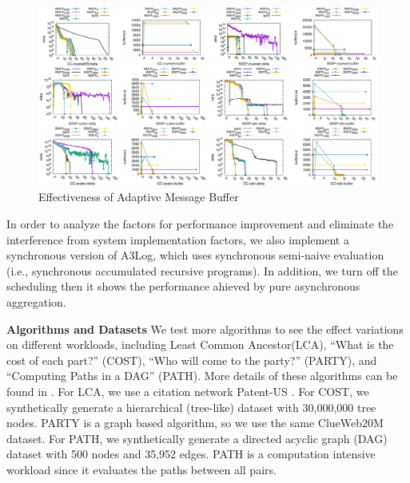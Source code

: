 \begin{figure}[!t]
	\vspace{0.0in}
	\centering
	\includegraphics[width=6.6in]{figuration/combine.eps}
	\vspace{-0.1in}
	\caption{Effectiveness of Adaptive Message Buffer}
	\label{fig:details}
	\vspace{-0.1in}
\end{figure}
In order to analyze the factors for performance improvement and eliminate the interference from system implementation factors, we also implement a synchronous version of A3Log, which uses synchronous semi-naive evaluation (i.e., synchronous accumulated recursive programs). In addition, we turn off the scheduling then it shows the performance ahieved by pure asynchronous aggregation.

\noindent\textbf{Algorithms and Datasets}
We test more algorithms to see the effect variations on different workloads, including Least Common Ancestor(LCA), ``What is the cost of each part?'' (COST), ``Who will come to the party?'' (PARTY), and ``Computing Paths in a DAG'' (PATH). More details of these algorithms can be found in \cite{fullversion}. For LCA, we use a citation network Patent-US \cite{konect}. For COST, we synthetically generate a hierarchical (tree-like) dataset with 30,000,000 tree nodes. PARTY is a graph based algorithm, so we use the same ClueWeb20M dataset. For PATH, we synthetically generate a directed acyclic graph (DAG) dataset with 500 nodes and 35,952 edges. PATH is a computation intensive workload since it evaluates the paths between all pairs.


